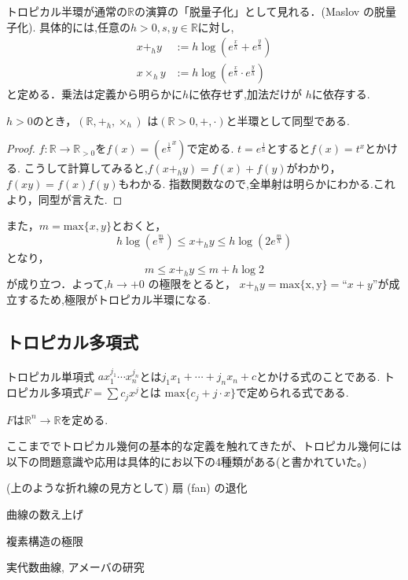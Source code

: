 \documentclass{ujarticle}
\renewenvironment{enumerate}
{
\begin{list}{(\arabic{enumi})}
{
\usecounter{enumi}
\setlength{\topsep}{0zh}
\setlength{\itemindent}{0zw}
\setlength{\leftmargin}{2zw} %
\setlength{\rightmargin}{0zw} %
\setlength{\labelsep}{1zw} %
\setlength{\labelwidth}{3zw} %
\setlength{\itemsep}{0em} %
\setlength{\parsep}{0em} %
\setlength{\listparindent}{1zw} %
}
}{
\end{list}
}
\begin{document}
トロピカル半環が通常の$\mathbb{R}$の演算の「脱量子化」として見れる．(Maslov の脱量子化).
具体的には,任意の$h > 0,s,y \in \mathbb{R}$に対し,
\begin{align*}
  x +_h y &:= h \log (e^{\frac{x}{h}} + e^{\frac{y}{h}}) \\
  x ×_h y &:= h \log(e^{\frac{x}{h}} \cdot e^{\frac{y}{h}})
\end{align*}
と定める．乗法は定義から明らかに$h$に依存せず,加法だけが $h$に依存する.
\begin{lem}
  $h > 0$のとき，$(\mathbb{R}, +_h, ×_h)$ は$(\mathbb{R}>0, +, ·)$と半環として同型である.
\end{lem}
\begin{proof}
$f:\mathbb{R} \to \mathbb{R}_{> 0}$を$f(x)=({e^{\frac{1}{h}}}^{x})$で定める.
$t =e^{\frac{1}{h}}$とすると$f(x)=t^x$とかける.
こうして計算してみると,$f(x +_h y) =f(x) +f(y)$がわかり，$f(xy) = f(x)f(y)$もわかる.
指数関数なので,全単射は明らかにわかる.これより，同型が言えた.
\end{proof}

また，$m = \mathrm{max}\{x, y\}$とおくと，
\begin{equation*}
  h \log (e^{\frac{m}{h}}) \le x +_h y \le   h \log (2e^{\frac{m}{h}})
\end{equation*}
となり，
\begin{equation*}
    m \le x +_h y \le m + h \log 2
\end{equation*}
が成り立つ．よって,$h \to +0$ の極限をとると，
$x +_h y = \mathrm{max\{x, y\}} = “ x + y ”$が成立するため,極限がトロピカル半環になる.

\subsection{トロピカル多項式}
\label{sub:トロピカル多項式}

\begin{dfn}
 トロピカル単項式 $ax_1^{j_1}\cdots x_n^{j_n}$とは$j_1x_1 + \cdots + j_nx_n +c$とかける式のことである.
 トロピカル多項式$F=\sum c_j x^j$とは $ \mathrm{max}\{c_j + j\cdot x\}$で定められる式である.
\end{dfn}
$F$は$\mathbb{R}^n \to \mathbb{R}$を定める.

\begin{rem}
ここまででトロピカル幾何の基本的な定義を触れてきたが、トロピカル幾何には以下の問題意識や応用は具体的にお以下の4種類がある(と書かれていた。)
\begin{enumerate}
\item  (上のような折れ線の見方として) 扇 (fan) の退化
\item  曲線の数え上げ
\item  複素構造の極限
\item 実代数曲線, アメーバの研究
\end{enumerate}
\end{rem}
\end{document}
